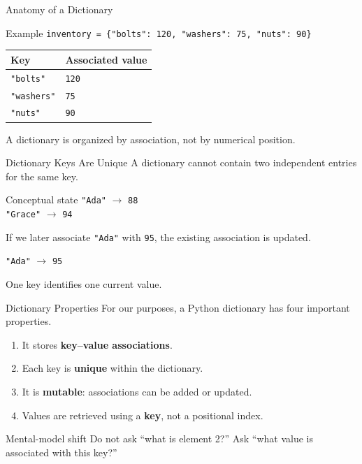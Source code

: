 \documentclass[aspectratio=169,10pt]{beamer}
\begin{document}
\begin{frame}{Anatomy of a Dictionary}
  \begin{block}{Example}
    \centering
    \texttt{inventory = \{"bolts": 120, "washers": 75, "nuts": 90\}}
  \end{block}

  \begin{center}
    \renewcommand{\arraystretch}{1.3}
    \begin{tabular}{l|l}
      \textbf{Key} & \textbf{Associated value} \\\hline
      \texttt{"bolts"} & \texttt{120} \\
      \texttt{"washers"} & \texttt{75} \\
      \texttt{"nuts"} & \texttt{90}
    \end{tabular}
  \end{center}

  \begin{keyidea}
    A dictionary is organized by association, not by numerical position.
  \end{keyidea}
\end{frame}

\begin{frame}{Dictionary Keys Are Unique}
  A dictionary cannot contain two independent entries for the same key.

  \begin{block}{Conceptual state}
    \texttt{"Ada"} $\rightarrow$ \texttt{88}\\
    \texttt{"Grace"} $\rightarrow$ \texttt{94}
  \end{block}

  If we later associate \texttt{"Ada"} with \texttt{95}, the existing association is updated.

  \begin{center}
    \texttt{"Ada"} $\rightarrow$ \texttt{95}
  \end{center}

  \begin{keyidea}
    One key identifies one current value.
  \end{keyidea}
\end{frame}

\begin{frame}{Dictionary Properties}
  For our purposes, a Python dictionary has four important properties.

  \begin{enumerate}
    \item It stores \textbf{key--value associations}.
    \item Each key is \textbf{unique} within the dictionary.
    \item It is \textbf{mutable}: associations can be added or updated.
    \item Values are retrieved using a \textbf{key}, not a positional index.
  \end{enumerate}

  \begin{alertblock}{Mental-model shift}
    Do not ask ``what is element 2?'' Ask ``what value is associated with this key?''
  \end{alertblock}
\end{frame}
\end{document}
